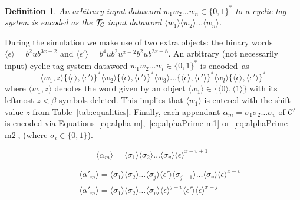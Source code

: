 \documentclass[11pt]{article} \usepackage{amsfonts,amsmath,amssymb,amsthm}
\newtheorem{definition}{Definition}
\newcommand{\tne}[1]{\ensuremath{\langle #1\rangle}}
\newcommand{\encodeOne}{\tne{1}}
\newcommand{\encodeZero}{\tne{0}}
\newcommand{\encodeDeletion}{\tne{\epsilon}}
\newcommand{\encodeDeletionSequence}{\ensuremath{b^2ub^{3x-2}}}
\newcommand{\encodeDeletionPrime}{\tne{\epsilon'}}
\newcommand{\encodeDeletionPrimeSequence}{\ensuremath{b^4ub^2u^{x-2}b^2ub^{2x-8}}}
\begin{document}
\begin{definition}\label{def:input encoding}
An arbitrary input dataword $w_1w_2\ldots w_n\in\{0,1\}^\ast$ to a cyclic tag system is encoded as the $\mathcal{T_{\mathcal{C}}}$ input dataword $\tne{w_1}\tne{w_2}\ldots \tne{w_n}$.
\end{definition}
During the simulation we make use of two extra objects: the binary words $\encodeDeletion=\encodeDeletionSequence$ and $\encodeDeletionPrime=\encodeDeletionPrimeSequence$. An arbitrary (not necessarily input) cyclic tag system dataword $w_1w_2\ldots w_l\in\{0,1\}^\ast$ is encoded~as
\begin{equation}\label{eq:encoding CTS configuration}
\tne{w_1,z}\{\encodeDeletion,\encodeDeletionPrime\}^\ast\tne{w_2}\{\encodeDeletion,\encodeDeletionPrime\}^\ast\tne{w_3}\ldots \{\encodeDeletion,\encodeDeletionPrime\}^\ast\tne{w_l}\{\encodeDeletion,\encodeDeletionPrime\}^\ast 
\end{equation}
where $\tne{w_1,z}$ denotes the word given by an object $\tne{w_1}\in\{ \encodeZero , \encodeOne \}$ with its leftmost $z<\beta$ symbols deleted. This implies that $\tne{w_1}$ is entered with the shift value $z$ from Table~\ref{tab:equalities}. Finally, each appendant $\alpha_m=\sigma_1\sigma_2\ldots\sigma_v$ of $\mathcal{C'}$ is encoded via Equations~\eqref{eq:alpha m},~\eqref{eq:alphaPrime m1} or~\eqref{eq:alphaPrime m2}, (where $\sigma_i\in\{0,1\}$).\\
\begin{minipage}{.4\textwidth}
 \begin{equation}
  \tne{\alpha_m}=\tne{\sigma_1}\tne{\sigma_2}\ldots\tne{\sigma_v}\encodeDeletion^{x-v+1}\;\label{eq:alpha m}
 \end{equation}
\end{minipage}
\begin{minipage}{.59\textwidth}
\begin{align}
&\;\;\;\tne{\alpha'_m}= \tne{\sigma_1}\tne{\sigma_2}\ldots\tne{\sigma_j}\encodeDeletionPrime\tne{\sigma_{j+1}}\ldots\tne{\sigma_v}\encodeDeletion^{x-v} \label{eq:alphaPrime m1} \\
&\;\;\;\tne{\alpha'_m}=\tne{\sigma_1}\tne{\sigma_2}\ldots\tne{\sigma_v}\encodeDeletion^{j-v}\encodeDeletionPrime\encodeDeletion^{x-j} \label{eq:alphaPrime m2}
\end{align}
\end{minipage}
\end{document}
